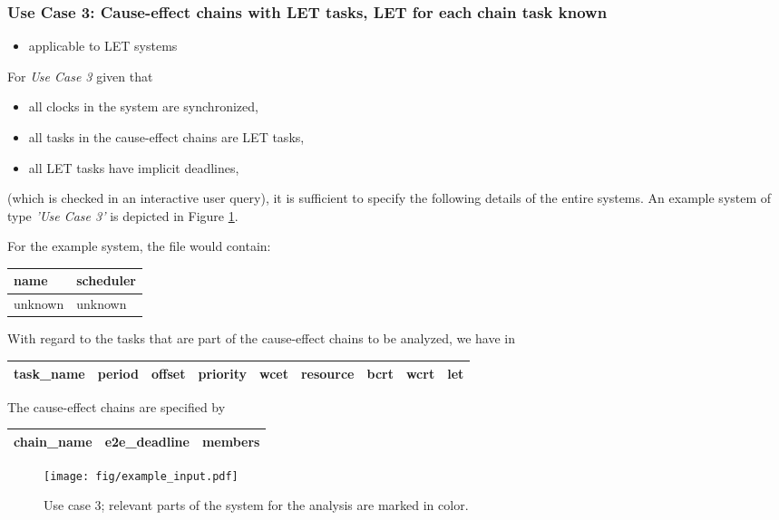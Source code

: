 \newpage
\subsubsection{Use Case 3: Cause-effect chains with LET tasks, LET for each chain task known}
\label{sec:input-files-let}
%

\begin{tcolorbox}
\begin{itemize}[leftmargin=*, itemsep=0pt]
	\item applicable to LET systems
\end{itemize}
\end{tcolorbox}
\bigskip

For \emph{Use Case 3} given that
\begin{itemize}[leftmargin=*, itemsep=0pt]
	\item all clocks in the system are synchronized,
	\item all tasks in the cause-effect chains are LET tasks,
	\item all LET tasks have implicit deadlines,	
\end{itemize}
(which is checked in an interactive user query), 
it is sufficient to specify the following details of the entire systems.
An example system of type \emph{'Use Case 3'} is depicted in Figure \ref{fig:use-case-3}.

For the example system, the file  would contain:
\begin{center}
	\begin{tabular}{|l|l|} \hline
		\textbf{name} & \textbf{scheduler} \\ \hline
		unknown & unknown \\ \hline
	\end{tabular}
\end{center}
With regard to the tasks that are part of the cause-effect chains to be analyzed, we have in  
\begin{center}
	\begin{tabular}{|l|l|l|l|l|l|l|l|l|} \hline
		  \textbf{task\_name}  
		& \textbf{period} 
		& \textbf{offset} 
		& \textbf{priority}
		& \textbf{wcet}
		& \textbf{resource} 
		& \textbf{bcrt}		
		& \textbf{wcrt}
		& \textbf{let} \\ \hline
	\end{tabular}
\end{center}

The cause-effect chains are specified by
\begin{center}
	\begin{tabular}{|l|l|l|l|l|} \hline
		\textbf{chain\_name} 
		& \textbf{e2e\_deadline}
		& \multicolumn{3}{|l|}{\textbf{members}} \\ \hline	
	\end{tabular}
\end{center}
%
\begin{figure}[h!]
	\centering
		\texttt{[image: fig/example\_input.pdf]}
	\caption{Use case 3; relevant parts of the system for the analysis are marked in color.}
	\label{fig:use-case-3}
\end{figure}




